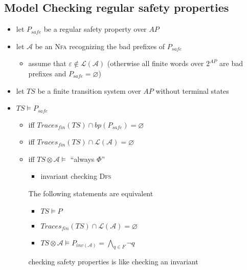 \documentclass[a4paper, 10pt]{article}
\begin{document}
\subsection*{Model Checking regular safety properties}

\begin{itemize}
    \item let $P_{safe}$ be a regular safety property over $AP$
    \item let $\mathcal{A}$ be an \textsc{Nfa} recognizing the bad prefixes of $P_{safe}$
    \begin{itemize}
        \item assume that $\varepsilon\not\in\mathcal{L}(\mathcal{A})$ (otherwise all finite words over $2^{AP}$ are bad prefixes and $P_{safe}=\varnothing$)
    \end{itemize}
    \item let $TS$ be a finite transition system over $AP$ without terminal states
    \item $TS\models P_{safe}$
    \begin{itemize}
        \item iff $Traces_{fin}(TS)\cap bp(P_{safe})=\varnothing$
        \item iff $Traces_{fin}(TS)\cap \mathcal{L}(\mathcal{A})=\varnothing$
        \item iff $TS\otimes\mathcal{A}\models $ ``always $\Phi$''
        \begin{itemize}
            \item invariant checking \follows  \textsc{Dfs}
        \end{itemize}
        \begin{shaded}
            The following statements are equivalent
            \begin{itemize}
                \item $TS\models P$
                \item $Traces_{fin}(TS)\cap\mathcal{L}(\mathcal{A})=\varnothing$
                \item $TS\otimes\mathcal{A} \models P_{inv(\mathcal{A})}=\bigwedge_{q\in F} \neg q$
            \end{itemize}
            \follows checking safety properties is like checking an invariant
        \end{shaded}
    \end{itemize}
\end{itemize}
\end{document}
